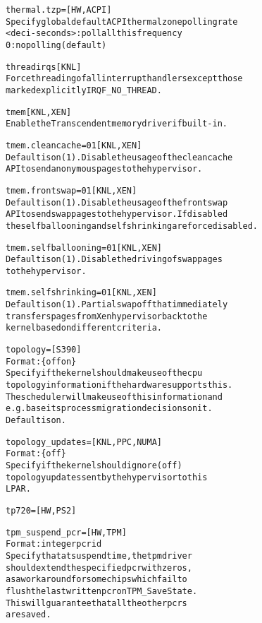 \documentclass[a4paper,8pt,english]{sphinxmanual}
\begin{document}
\begin{alltt}
        thermal.tzp=    {[}HW,ACPI{]}
                        Specify global default ACPI thermal zone polling rate
                        \textless{}deci-seconds\textgreater{}: poll all this frequency
                        0: no polling (default)

        threadirqs      {[}KNL{]}
                        Force threading of all interrupt handlers except those
                        marked explicitly IRQF\_NO\_THREAD.

        tmem            {[}KNL,XEN{]}
                        Enable the Transcendent memory driver if built-in.

        tmem.cleancache=0\textbar{}1 {[}KNL, XEN{]}
                        Default is on (1). Disable the usage of the cleancache
                        API to send anonymous pages to the hypervisor.

        tmem.frontswap=0\textbar{}1 {[}KNL, XEN{]}
                        Default is on (1). Disable the usage of the frontswap
                        API to send swap pages to the hypervisor. If disabled
                        the selfballooning and selfshrinking are force disabled.

        tmem.selfballooning=0\textbar{}1 {[}KNL, XEN{]}
                        Default is on (1). Disable the driving of swap pages
                        to the hypervisor.

        tmem.selfshrinking=0\textbar{}1 {[}KNL, XEN{]}
                        Default is on (1). Partial swapoff that immediately
                        transfers pages from Xen hypervisor back to the
                        kernel based on different criteria.

        topology=       {[}S390{]}
                        Format: \{off \textbar{} on\}
                        Specify if the kernel should make use of the cpu
                        topology information if the hardware supports this.
                        The scheduler will make use of this information and
                        e.g. base its process migration decisions on it.
                        Default is on.

        topology\_updates= {[}KNL, PPC, NUMA{]}
                        Format: \{off\}
                        Specify if the kernel should ignore (off)
                        topology updates sent by the hypervisor to this
                        LPAR.

        tp720=          {[}HW,PS2{]}

        tpm\_suspend\_pcr={[}HW,TPM{]}
                        Format: integer pcr id
                        Specify that at suspend time, the tpm driver
                        should extend the specified pcr with zeros,
                        as a workaround for some chips which fail to
                        flush the last written pcr on TPM\_SaveState.
                        This will guarantee that all the other pcrs
                        are saved.


\end{alltt}
\end{document}
